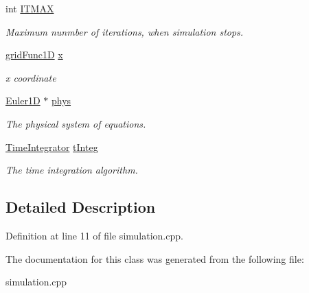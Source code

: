 \begin{DoxyCompactItemize}
\mbox{\label{classSimulation_a592c3b6538cbd268fc31aa806cdddef5}} 
int \hyperlink{classSimulation_a592c3b6538cbd268fc31aa806cdddef5}{I\+T\+M\+AX}
\begin{DoxyCompactList}\small\item\em Maximum nunmber of iterations, when simulation stops. \end{DoxyCompactList}\item 
\mbox{\label{classSimulation_adb5a7b5d86b920135fb2bf2a0d9516e0}} 
\hyperlink{classgridFunc1D}{grid\+Func1D} \hyperlink{classSimulation_adb5a7b5d86b920135fb2bf2a0d9516e0}{x}
\begin{DoxyCompactList}\small\item\em x coordinate \end{DoxyCompactList}\item 
\mbox{\label{classSimulation_a801473291b7cf8bf290192383db659e1}} 
\hyperlink{classEuler1D}{Euler1D} $\ast$ \hyperlink{classSimulation_a801473291b7cf8bf290192383db659e1}{phys}
\begin{DoxyCompactList}\small\item\em The physical system of equations. \end{DoxyCompactList}\item 
\mbox{\label{classSimulation_aeee15f5e02978c9b1d3a363e3d6a3800}} 
\hyperlink{classTimeIntegrator}{Time\+Integrator} \hyperlink{classSimulation_aeee15f5e02978c9b1d3a363e3d6a3800}{t\+Integ}
\begin{DoxyCompactList}\small\item\em The time integration algorithm. \end{DoxyCompactList}\end{DoxyCompactItemize}


\subsection{Detailed Description}


Definition at line 11 of file simulation.\+cpp.



The documentation for this class was generated from the following file\+:\begin{DoxyCompactItemize}
\item 
simulation.\+cpp\end{DoxyCompactItemize}
